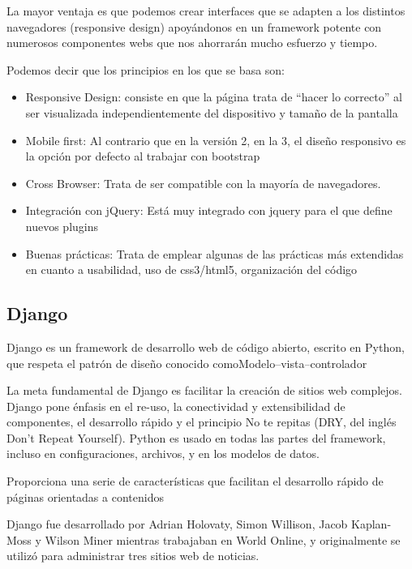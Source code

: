 La mayor ventaja es que podemos crear interfaces que se adapten a los distintos navegadores (responsive design) apoyándonos en un framework potente con numerosos componentes webs que nos ahorrarán mucho esfuerzo y tiempo.

Podemos decir que los principios en los que se basa son:
\setlength{\parskip}{0mm}
\begin{itemize}

	\item Responsive Design: consiste en que la página trata de “hacer lo correcto” al ser visualizada independientemente del dispositivo y tamaño de la pantalla
	
	\item Mobile first: Al contrario que en la versión 2, en la 3, el diseño responsivo es la opción por defecto al trabajar con bootstrap

	\item Cross Browser: Trata de ser compatible con la mayoría de navegadores.
	
	\item Integración con jQuery: Está muy integrado con jquery para el que define nuevos plugins

	\item Buenas prácticas: Trata de emplear algunas de las prácticas más extendidas en cuanto a usabilidad, uso de css3/html5, organización del código
	
	
\end{itemize}

\subsection{Django}
\setlength{\parskip}{5mm}
Django es un framework de desarrollo web de código abierto, escrito en Python, que respeta el patrón de diseño conocido comoModelo–vista–controlador

La meta fundamental de Django es facilitar la creación de sitios web complejos. Django pone énfasis en el re-uso, la conectividad y extensibilidad de componentes, el desarrollo rápido y el principio No te repitas (DRY, del inglés Don't Repeat Yourself). Python es usado en todas las partes del framework, incluso en configuraciones, archivos, y en los modelos de datos.

Proporciona una serie de características que facilitan el desarrollo rápido de páginas orientadas a contenidos

Django fue desarrollado por Adrian Holovaty, Simon Willison, Jacob Kaplan-Moss y Wilson Miner mientras trabajaban en World Online, y originalmente se utilizó para administrar tres sitios web de noticias.

